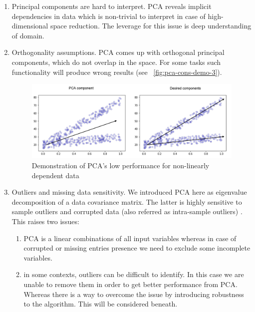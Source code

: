 \begin{enumerate}
	\item Principal components are hard to interpret.
	PCA reveals implicit dependencies in data which is non-trivial to interpret in case of high-dimensional space reduction. The leverage for this issue is deep understanding of domain.
	
	\item Orthogonality assumptions.
	PCA comes up with orthogonal principal components, which do not overlap in the space. For some tasks such functionality will produce wrong results (see ~\autoref{fig:pca-cons-demo-3}).
	
	\begin{figure}[h]
		\centering
		\includegraphics[scale=0.5]{img/non-orthogonal-components.png}
		\caption{\label{fig:pca-cons-demo-3}Demonstration of PCA's low performance for non-linearly dependent data}
	\end{figure}

	\item Outliers and missing data sensitivity.
	We introduced PCA here as eigenvalue decomposition of a data covariance matrix. The latter is highly sensitive to sample outliers and corrupted data (also referred as intra-sample outliers) \citep{shlens}. This raises two issues:
		\begin{enumerate}
			\item PCA is a linear combinations of all input variables whereas in case of corrupted or missing entries presence we need to exclude some incomplete variables.
			
			\item in some contexts, outliers can be difficult to identify. In this case we are unable to remove them in order to get better performance from PCA. Whereas there is a way to overcome the issue by introducing robustness to the algorithm. This will be considered beneath.
		\end{enumerate}
	
	
\end{enumerate}

